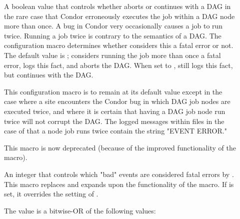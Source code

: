 \begin{description}

\item[]
\label{param:DAGManIgnoreDuplicateJobExecution}
A boolean value that controls
whether  aborts or continues with a DAG
in the rare case that Condor erroneously executes
the job within a DAG node more than once.
A bug in Condor very occasionally causes a job to run twice.
Running a job twice is contrary to the semantics of a DAG.
The configuration macro 
determines whether   considers this a fatal error or not.
The default value is ;  considers
running the job more than once a fatal error, 
logs this fact,
and aborts the DAG.
When set to ,  still
logs this fact,
but continues with the DAG. 

This configuration macro is to remain at its default value 
except in the case
where a site encounters the Condor bug in which DAG job nodes
are executed twice,
and where it is certain
that having a DAG job node run twice will not corrupt the DAG.
The logged messages within  files
in the case of that a node job runs twice
contain the string
"EVENT ERROR."

This macro is now deprecated (because of the improved functionality
of the  macro).

\item[]
\label{param:DAGManAllowEvents}
An integer that controls which "bad" events are considered
fatal errors by .  This macro replaces and expands
upon the functionality of the
 macro.
If  is set, it overrides the
setting of .

The  value is a bitwise-OR of the
following values:


\end{description}
